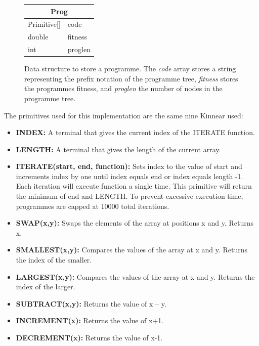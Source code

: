 \documentclass{article}
\begin{document}
	\begin{figure}[h]
		\centering
		\begin{tabular}{|l l|}
			\hline
			\multicolumn{2}{|c|}{Prog}\\
			\hline
			Primitive[] & code \\
			double & fitness\\
			int & proglen\\
			\hline
		\end{tabular}
		\caption{Data structure to store a programme. The \textit{code} array stores a string representing the prefix notation of the programme tree, \textit{fitness} stores the programmes fitness, and \textit{proglen} the number of nodes in the programme tree.}
		
		\label{struct:gp_prog}
	\end{figure}
	
	The primitives used for this implementation are the same nine Kinnear used:
	\begin{multicols}{2}
		\begin{itemize}
			\item \textbf{INDEX:} A terminal that gives the current index of the ITERATE function.
			\item \textbf{LENGTH:} A terminal that gives the length of the current array.
			\item \textbf{ITERATE(start, end, function):}  Sets index to the value of start and increments index by one until index equals end or index equals length -1. Each iteration will execute function a single time. This primitive will return the minimum of end and LENGTH. To prevent excessive execution time, programmes are capped at 10000 total iterations.
			\item \textbf{SWAP(x,y):}  Swaps the elements of the array at positions x and y. Returns x.
			\item \textbf{SMALLEST(x,y):} Compares the values of the array at x and y. Returns the index of the smaller.
			\item \textbf{LARGEST(x,y):} Compares the values of the array at x and y. Returns the index of the larger. 
			
			\item \textbf{SUBTRACT(x,y):} Returns the value of x – y.
			\item \textbf{INCREMENT(x):} Returns the value of x+1.
			\item \textbf{DECREMENT(x):} Returns the value of x-1.
			
		\end{itemize}
	\end{multicols}
	
\end{document}
